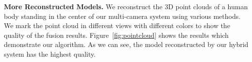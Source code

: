 \noindent \textbf{More Reconstructed Models.}
%
We reconstruct the 3D point clouds of a human body standing in the center of our multi-camera system using various methods.  We mark the point cloud in different views with different colors to show the quality of the fusion results. Figure~\ref{fig:pointcloud} shows the results which demonstrate our algorithm. As we can see, the model reconstructed by our hybrid system has the highest quality. 


\begin{figure}[ht]
  \centering
{}%
\end{figure}
